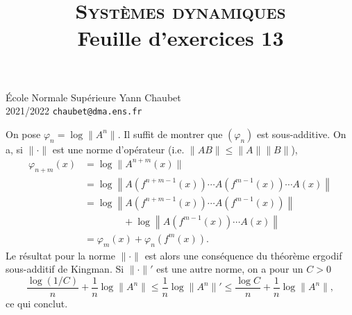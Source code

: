 \documentclass[a4paper,12pt,openany]{article}
\title{\textsc{Syst\`emes dynamiques} \\ Feuille d'exercices 13}
\date{}
\author{}
\theoremstyle{plain}
\theoremstyle{definition}
\begin{document}
{\noindent \'Ecole Normale Sup\'erieure  \hfill Yann Chaubet } \\
{2021/2022 \hfill \texttt{chaubet@dma.ens.fr}}

{\let\newpage\relax\maketitle}
\maketitle


 \vspace{1.5mm} 

\noindent
On pose $\varphi_n = \log \|A^{n}\|$. Il suffit de montrer que $(\varphi_n)$ est sous-additive.  
On a, si $\|\cdot\|$ est une norme d'op\'erateur (i.e. $\|AB\| \leqslant \|A\|\|B\|$),
$$
\begin{aligned}
\varphi_{n+m}(x) &= \log \|A^{n+m}(x)\|  \\
&= \log \left\| A(f^{n+m-1}(x)) \cdots A(f^{m-1}(x)) \cdots A(x)\right\|  \\
&= \log\left\| A(f^{n+m-1}(x)) \cdots A(f^{m-1}(x))\right\| \\
&\quad \quad \quad \quad  + \log \left\|A(f^{m-1}(x)) \cdots A(x) \right\|  \\
&= \varphi_m(x) + \varphi_n(f^m(x)).
\end{aligned}
$$
Le r\'esultat pour la norme $\|\cdot\|$ est alors une cons\'equence du th\'eor\`eme ergodif sous-additif de Kingman.  
Si $\|\cdot\|'$ est une autre norme, on a pour un $C > 0$
$$
\frac{\log (1/C)}{n} + \frac{1}{n}\log \|A^n\| \leqslant \frac{1}{n} \log \|A^n\|' \leqslant \frac{\log C}{n} +  \frac{1}{n} \log \|A^n\|,
$$
ce qui conclut.
\vspace{0.6cm}



 \vspace{1.5mm}
\end{document}
